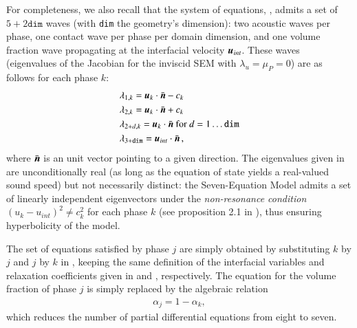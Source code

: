 \documentclass[preprint,10pt]{elsarticle}
\begin{document}
For completeness, we also recall that the system of equations, 
, 
admits a set of $5+2\texttt{dim}$ waves (with \texttt{dim} the geometry's dimension): 
two acoustic waves per phase, one contact wave per phase per domain dimension, and one volume fraction wave propagating 
at the interfacial velocity $\boldsymbol u_{int}$. These waves (eigenvalues of the Jacobian for the inviscid SEM with $\lambda_u = \mu_P=0$) are as follows for each phase $k$: 
% 
\begin{align}\label{eq:eigenvalues}
&\lambda_{1,k} = \boldsymbol u_k \cdot \bar{\boldsymbol n} - c_k \nonumber\\
&\lambda_{2,k} = \boldsymbol u_k \cdot \bar{\boldsymbol n} + c_k \nonumber\\
&\lambda_{2+d,k} = \boldsymbol u_k \cdot \bar{\boldsymbol n} \text{ for } d = 1 \dots \texttt{dim} \\
&\lambda_{3+\texttt{dim}} = \boldsymbol u_{int} \cdot \bar{\boldsymbol n} \nonumber \,,
\end{align}
%
where $\bar{\boldsymbol n}$ is an unit vector pointing to a given direction. 
The eigenvalues given in  are unconditionally 
real (as long as the equation of state yields a real-valued sound speed) but not necessarily distinct: the Seven-Equation Model admits 
a set of linearly independent eigenvectors under the \emph{non-resonance condition} $(u_k-u_{int})^2 \neq c_k^2$ for each phase $k$ 
(see proposition 2.1 in \cite{coquel_herard}), thus ensuring hyperbolicity of the model. 

The set of equations satisfied by phase $j$ are simply obtained by substituting $k$ by $j$ and $j$ by $k$ in , keeping 
the same definition of the interfacial variables and relaxation coefficients given in  and , respectively. The 
equation for the volume fraction of phase $j$ 
is simply replaced by the algebraic relation
%
\begin{align}
 \alpha_{j}= 1 - \alpha_{k}, \nonumber
\end{align}
%
which reduces the number of partial differential equations from eight to seven. %
%
\end{document}
